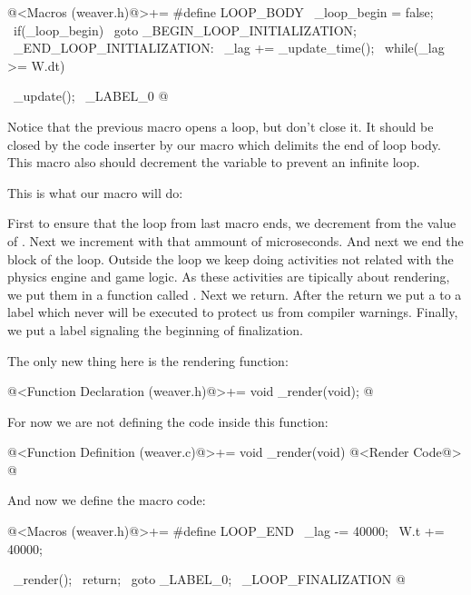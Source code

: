 \iniciocodigo
@<Macros (weaver.h)@>+=
#define LOOP_BODY                                            \
  _loop_begin =  false;                                      \
  if(_loop_begin)                                            \
    goto _BEGIN_LOOP_INITIALIZATION;                         \
_END_LOOP_INITIALIZATION:                                    \
  _lag += _update_time();                                    \
  while(_lag >= W.dt){                                       \
    _update();                                               \
_LABEL_0
@
\fimcodigo

Notice that the previous macro opens a \monoespaco{while} loop, but
don't close it. It should be closed by the code inserter by our macro
which delimits the end of loop body. This macro also should decrement
the variable \monoespaco{\_lag} to prevent an infinite loop.


This is what our macro  will do:

First to ensure that the loop from last macro ends, we decrement from
\monoespaco{\_lag} the value of \monoespaco{W.dt}. Next we increment
\monoespaco{W.t} with that ammount of microseconds. And next we end
the block of the loop. Outside the loop we keep doing activities not
related with the physics engine and game logic. As these activities
are tipically about rendering, we put them in a function called 
\monoespaco{\_render}. Next we return. After the return we put a
 to a label which never will be executed to protect us
from compiler warnings. Finally, we put a label signaling the
beginning of finalization.

The only new thing here is the rendering function:

\iniciocodigo
@<Function Declaration (weaver.h)@>+=
void _render(void);
@
\fimcodigo

For now we are not defining the code inside this function:

\iniciocodigo
@<Function Definition (weaver.c)@>+=
void _render(void){
  @<Render Code@>
}
@
\fimcodigo

And now we define the macro code:

\iniciocodigo
@<Macros (weaver.h)@>+=
#define LOOP_END                                           \
    _lag -=  40000;                                        \
    W.t +=  40000;                                         \
  }                                                        \
  _render();                                               \
  return;                                                  \
  goto _LABEL_0;                                           \
_LOOP_FINALIZATION
@
\fimcodigo

